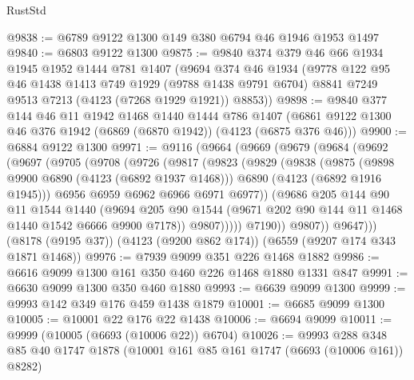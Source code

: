 \begin{lexlean}{RustStd}
\begin{coremodule}
@9838 := @6789 @9122 @1300 @149 @380 @6794 @46 @1946 @1953 @1497
@9840 := @6803 @9122 @1300
@9875 := @9840
    @374
    @379
    @46
    @66
    @1934
    @1945
    @1952
    @1444
    @781
    @1407
    (@9694
      @374
      @46
      @1934
      (@9778
        @122
        @95
        @46
        @1438
        @1413
        @749
        @1929
        (@9788 @1438 @9791 @6704)
        @8841
        @7249
        @9513
        @7213
        (@4123 (@7268 @1929 @1921))
        @8853))
@9898 := @9840
    @377
    @144
    @46
    @11
    @1942
    @1468
    @1440
    @1444
    @786
    @1407
    (@6861 @9122 @1300 @46 @376 @1942 (@6869 (@6870 @1942)) (@4123 (@6875 @376 @46)))
@9900 := @6884 @9122 @1300
@9971 := @9116
    (@9664
      (@9669
        (@9679
          (@9684
            (@9692
              (@9697
                (@9705
                  (@9708
                    (@9726
                      (@9817
                        (@9823
                          (@9829
                            (@9838
                              (@9875
                                (@9898 @9900 @6890 (@4123 (@6892 @1937 @1468)))
                                @6890
                                (@4123 (@6892 @1916 @1945)))
                              @6956
                              @6959
                              @6962
                              @6966
                              @6971
                              @6977))
                          (@9686
                            @205
                            @144
                            @90
                            @11
                            @1544
                            @1440
                            (@9694
                              @205
                              @90
                              @1544
                              (@9671 @202 @90 @144 @11 @1468 @1440 @1542 @6666 @9900 @7178))
                            @9807)))))
                  @7190))
              @9807))
          @9647)))
    (@8178 (@9195 @37))
    (@4123 (@9200 @862 @174))
    (@6559 (@9207 @174 @343 @1871 @1468))
@9976 := @7939 @9099 @351 @226 @1468 @1882
@9986 := @6616 @9099 @1300 @161 @350 @460 @226 @1468 @1880 @1331 @847
@9991 := @6630 @9099 @1300 @350 @460 @1880
@9993 := @6639 @9099 @1300
@9999 := @9993 @142 @349 @176 @459 @1438 @1879
@10001 := @6685 @9099 @1300
@10005 := @10001 @22 @176 @22 @1438
@10006 := @6694 @9099
@10011 := @9999 (@10005 (@6693 (@10006 @22)) @6704)
@10026 := @9993
    @288
    @348
    @85
    @40
    @1747
    @1878
    (@10001 @161 @85 @161 @1747 (@6693 (@10006 @161)) @8282)

\end{coremodule}
\end{lexlean}
